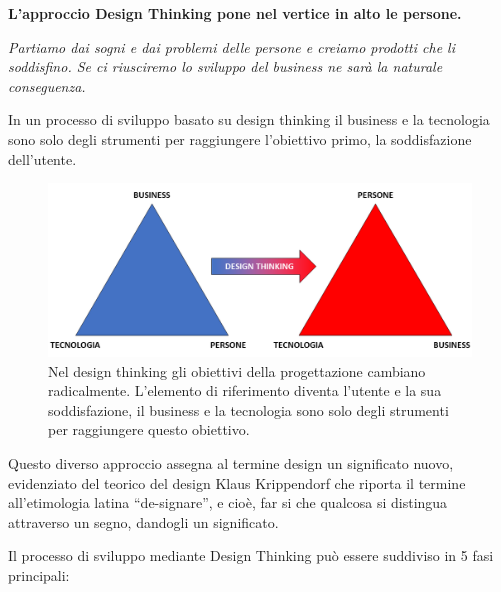 \textbf{L’approccio Design Thinking pone nel vertice in alto le persone.}

\textit{Partiamo dai sogni e dai problemi delle persone e creiamo prodotti che li soddisfino. Se ci riusciremo lo sviluppo del business ne sarà la naturale conseguenza.} 

In un processo di sviluppo basato su design thinking il business e la tecnologia sono solo degli strumenti per raggiungere l'obiettivo primo, la soddisfazione dell'utente.

\begin{figure}[!h]
	\centering
	\includegraphics[width=\textwidth]{immagini/des_think.png}
	\caption{Nel design thinking gli obiettivi della progettazione cambiano radicalmente. L'elemento di riferimento diventa l'utente e la sua soddisfazione, il business e la tecnologia sono solo degli strumenti per raggiungere questo obiettivo.}
	\label{fig:dt_piramide}
\end{figure}

Questo diverso approccio assegna al termine design un significato nuovo, evidenziato del teorico del design Klaus Krippendorf che riporta il termine all’etimologia latina “de-signare”, e cioè, far si che qualcosa si distingua attraverso un segno, dandogli un significato. 

Il processo di sviluppo mediante Design Thinking può essere suddiviso in 5 fasi principali:

